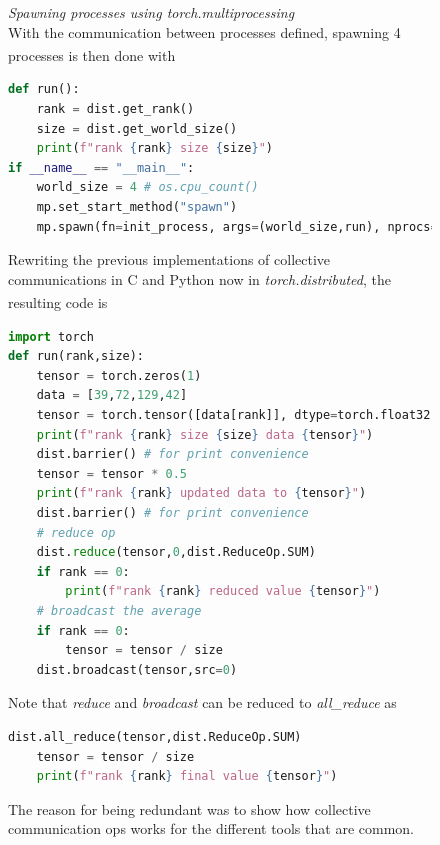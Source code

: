 \documentclass[12pt]{article}
\newcommand{\customtext}[3]{%
    \vspace{#2} %
    \fontsize{13}{8}\textcolor{#1}{\textit{#3}}%
}
\newcommand{\sidecite}[1]{\textsuperscript{\textcolor{blue}{\textbf{\scriptsize#1}}}}
\newcommand{\maincitecount}{\sidecite{\stepcounter{maincite}\themaincite}}
\begin{document}
\begin{figure}[!htb]
    \begin{minipage}[t]{0.65\textwidth}
    \raggedright
    \customtext{xtitle}{0em}{Spawning processes using torch.multiprocessing}\\
    With the communication between processes defined, spawning 4 processes is then 
    done with \maincitecount
\begin{lstlisting}[language=python,style=python,basicstyle=\ttfamily\footnotesize]
def run():
    rank = dist.get_rank()
    size = dist.get_world_size()
    print(f"rank {rank} size {size}")
if __name__ == "__main__":
    world_size = 4 # os.cpu_count()
    mp.set_start_method("spawn")
    mp.spawn(fn=init_process, args=(world_size,run), nprocs=world_size, join=True)
\end{lstlisting}
Rewriting the previous implementations of collective communications in C and Python
now in {\it \color{xlink}torch.distributed}, the resulting code is\maincitecount
\begin{lstlisting}[language=python,style=python,basicstyle=\ttfamily\footnotesize]
import torch
def run(rank,size):
    tensor = torch.zeros(1)
    data = [39,72,129,42]
    tensor = torch.tensor([data[rank]], dtype=torch.float32)
    print(f"rank {rank} size {size} data {tensor}")
    dist.barrier() # for print convenience
    tensor = tensor * 0.5
    print(f"rank {rank} updated data to {tensor}")
    dist.barrier() # for print convenience
    # reduce op
    dist.reduce(tensor,0,dist.ReduceOp.SUM)
    if rank == 0:
        print(f"rank {rank} reduced value {tensor}")
    # broadcast the average
    if rank == 0:
        tensor = tensor / size
    dist.broadcast(tensor,src=0)
\end{lstlisting}
Note that {\it reduce} and {\it broadcast} can be reduced to {\it all\_reduce} as 
\begin{lstlisting}[language=python,style=python,basicstyle=\ttfamily\footnotesize]
    dist.all_reduce(tensor,dist.ReduceOp.SUM)
    tensor = tensor / size
    print(f"rank {rank} final value {tensor}")
\end{lstlisting}
The reason for being redundant was to show how collective communication 
ops works for the different tools that are common.
\end{minipage}%
\hspace{25pt}
\begin{minipage}[t]{.4\textwidth}

\end{minipage}
\end{figure}
\end{document}
